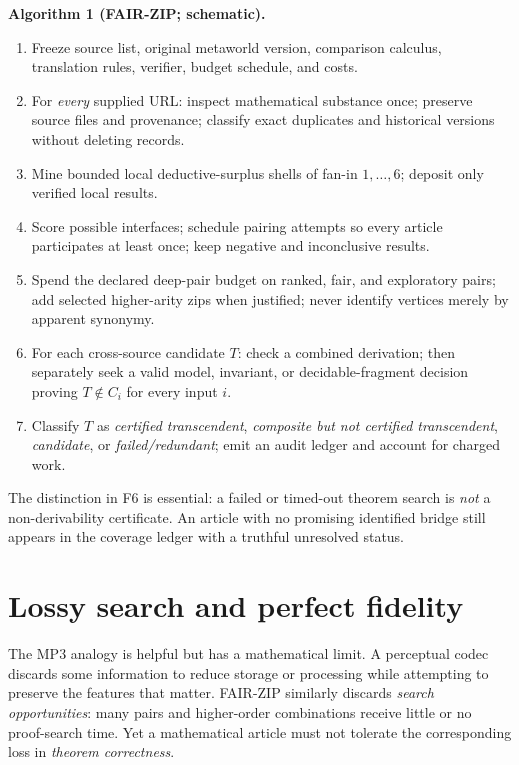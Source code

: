 \documentclass[11pt,letterpaper]{article}
\begin{document}
\noindent\textbf{Algorithm 1 (FAIR-ZIP; schematic).}
\begin{enumerate}[label=\textsf{F\arabic*.},leftmargin=3.5em,itemsep=3pt]
\item Freeze source list, original metaworld version, comparison calculus, translation rules, verifier, budget schedule, and costs.
\item For \emph{every} supplied URL: inspect mathematical substance once; preserve source files and provenance; classify exact duplicates and historical versions without deleting records.
\item Mine bounded local deductive-surplus shells of fan-in $1,\ldots,6$; deposit only verified local results.
\item Score possible interfaces; schedule pairing attempts so every article participates at least once; keep negative and inconclusive results.
\item Spend the declared deep-pair budget on ranked, fair, and exploratory pairs; add selected higher-arity zips when justified; never identify vertices merely by apparent synonymy.
\item For each cross-source candidate $T$: check a combined derivation; then separately seek a valid model, invariant, or decidable-fragment decision proving $T\notin C_i$ for every input $i$.
\item Classify $T$ as \emph{certified transcendent}, \emph{composite but not certified transcendent}, \emph{candidate}, or \emph{failed/redundant}; emit an audit ledger and account for charged work.
\end{enumerate}
The distinction in F6 is essential: a failed or timed-out theorem search is \emph{not} a non-derivability certificate. An article with no promising identified bridge still appears in the coverage ledger with a truthful unresolved status.

\section{Lossy search and perfect fidelity}
The MP3 analogy is helpful but has a mathematical limit. A perceptual codec discards some information to reduce storage or processing while attempting to preserve the features that matter. FAIR-ZIP similarly discards \emph{search opportunities}: many pairs and higher-order combinations receive little or no proof-search time. Yet a mathematical article must not tolerate the corresponding loss in \emph{theorem correctness}.
\end{document}
